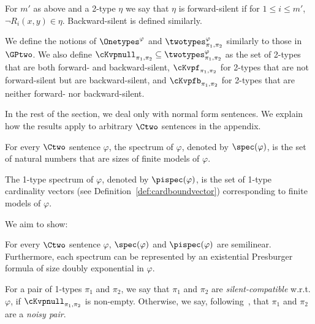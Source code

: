 \begin{definition}
    For $m'$ as above and a 2-type $\eta$ 
    we say that $\eta$ is forward-silent if for $1 \le i \le m'$,
    $\neg R_i(x, y) \in \eta$.
    Backward-silent is defined similarly.
\end{definition}

We define the notions of $\Onetypes^\varphi$ and $\twotypes^\varphi_{\pi_1, \pi_2}$ similarly to those in $\GPtwo$.
We also define
$\cKvpnull_{\pi_1, \pi_2} \subseteq \twotypes^\varphi_{\pi_1, \pi_2}$ as the set of 2-types that are both forward- and backward-silent,
$\cKvpf_{\pi_1, \pi_2}$ for 2-types that are not forward-silent but are backward-silent,
and
$\cKvpfb_{\pi_1, \pi_2}$ for 2-types that are neither forward- nor backward-silent.

In the rest of the section, we deal only with normal form sentences. We explain how the results apply to arbitrary $\Ctwo$ sentences in the appendix.

\begin{definition}
    For every $\Ctwo$ sentence $\varphi$,
    the spectrum of $\varphi$, denoted by $\spec(\varphi)$,
    is the set of natural numbers that are sizes of finite models of $\varphi$.

    The 1-type spectrum of $\varphi$, denoted by $\pispec(\varphi)$,
    is the set of 1-type cardinality vectors (see Definition~\ref{def:cardboundvector}) corresponding to finite models of $\varphi$.
\end{definition}

We aim to show: 

\begin{theorem} \label{thm:spectrasemilinear}
    For every $\Ctwo$ sentence $\varphi$,
    $\spec(\varphi)$ and $\pispec(\varphi)$ are semilinear.
    Furthermore, each spectrum can be represented by an existential Presburger formula of size doubly exponential in $\varphi$.
\end{theorem}

\begin{definition}
    For a pair of 1-types $\pi_1$ and $\pi_2$,
    we say that $\pi_1$ and $\pi_2$ are \emph{silent-compatible} w.r.t. $\varphi$,
    if $\cKvpnull_{\pi_1, \pi_2}$ is non-empty. Otherwise, we say, following~\cite{ctwocomplexity}, that 
    $\pi_1$ and $\pi_2$ are a \emph{noisy pair}.
\end{definition}

